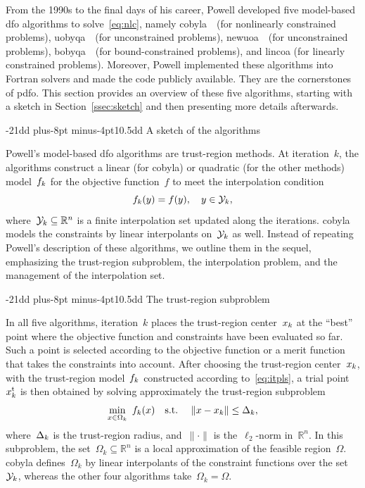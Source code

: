 \documentclass[
    smallextended,  %
    final,          %
]{svjour3}
\makeatletter
\newcommand{\R}{\mathbb{R}}
\newcommand{\fsetm}[1][k]{\Omega_{#1}}
\newcommand{\fset}{\Omega}
\newcommand{\iter}[1][k]{x\ifthenelse{\equal{#1}{}}{}{_{#1}}}
\newcommand{\norm}[2][]{#1\lVert#2#1\rVert}
\newcommand{\objm}[1][k]{\obj\ifthenelse{\equal{#1}{}}{}{_{#1}}}
\newcommand{\obj}{f}
\newcommand{\rad}[1][k]{\Delta\ifthenelse{\equal{#1}{}}{}{_{#1}}}
\newcommand{\st}{\text{s.t.}}
\newcommand{\trust}{{\text{t}}}
\newcommand{\xpt}[1][k]{\mathcal{Y}\ifthenelse{\equal{#1}{}}{}{_{#1}}}
\def\subsection{\@startsection{subsection}{2}{\z@}%
    {-21dd plus-8pt minus-4pt}{10.5dd}
     {\normalsize\bfseries}}
\def\subsubsection{\@startsection{subsubsection}{2}{\z@}%
    {-21dd plus-8pt minus-4pt}{10.5dd}
     {\normalsize\bfseries}}
\makeatother
\begin{document}
From the 1990s to the final days of his career, Powell developed five model-based \gls{dfo}
algorithms to solve~\eqref{eq:nlc}, namely \gls{cobyla}~\cite{Powell_1994}~(for nonlinearly
constrained problems), \gls{uobyqa}~\cite{Powell_2002}~(for unconstrained problems),
\gls{newuoa}~\cite{Powell_2006}~(for unconstrained problems), \gls{bobyqa}~\cite{Powell_2009}~(for
bound-constrained problems), and \gls{lincoa} (for linearly constrained problems).
Moreover, Powell implemented these algorithms into Fortran solvers and made the code publicly available.
They are the cornerstones of \gls{pdfo}.
This section provides an overview of these five algorithms, starting with a sketch in
Section~\ref{ssec:sketch} and then presenting more details afterwards.

\subsection{A sketch of the algorithms}
\label{ssec:sketch}

Powell's model-based \gls{dfo} algorithms are trust-region methods.
At iteration~$k$, the algorithms construct a linear (for \gls{cobyla}) or quadratic (for the other methods) model~$\objm$ for the objective function~$f$ to meet the interpolation condition
\begin{equation}
    \label{eq:itpls}
    \objm(y) = \obj(y), \quad y \in \xpt,
\end{equation}
where~$\xpt \subseteq \R^n$ is a finite interpolation set updated along the iterations.
\Gls{cobyla} models the constraints by linear interpolants on~$\xpt$ as well.
Instead of repeating Powell's description of these algorithms, we outline them in the sequel, emphasizing the trust-region subproblem, the interpolation problem, and the management of the interpolation set.

\subsubsection{The trust-region subproblem}

In all five algorithms, iteration~$k$ places the trust-region center~$\iter$ at the ``best'' point where the objective function and constraints have been evaluated so far.
Such a point is selected according to the objective function or a merit function that takes the constraints into account.
After choosing the trust-region center~$\iter$, with the trust-region model~$\objm$ constructed
according to~\eqref{eq:itpls}, a trial point~$\iter^{\trust}$ is then obtained by solving approximately the trust-region subproblem
\begin{equation}
    \label{eq:trsp}
        \min_{x \in \fsetm}  ~\objm(x) \quad \st \quad ~\norm{x - \iter} \le \rad,
\end{equation}
where~$\rad$ is the trust-region radius, and~$\norm{\cdot}$ is the~$\ell_2$-norm in~$\R^n$.
In this subproblem, the set~$\fsetm \subseteq \R^n$ is a local approximation of the feasible region~$\fset$.
\Gls{cobyla} defines~$\fsetm$ by linear interpolants of the constraint functions over the set~$\xpt$,
whereas the other four algorithms take~$\fsetm = \fset$.
\end{document}
